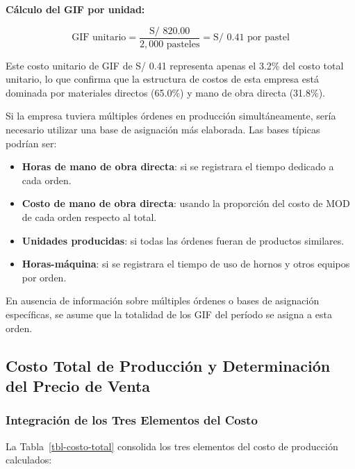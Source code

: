 \documentclass[
  stu,
  floatsintext,
  longtable,
  a4paper,
  nolmodern,
  notxfonts,
  notimes,
  12pt,
  colorlinks=true,linkcolor=blue,citecolor=blue,urlcolor=blue]{apa7}
\providecommand{\tightlist}{%
  \setlength{\itemsep}{0pt}\setlength{\parskip}{0pt}}
\begin{document}
\textbf{Cálculo del GIF por unidad:}

\[
\text{GIF unitario} = \frac{\text{S/ 820.00}}{2,000 \text{ pasteles}} = \text{S/ 0.41 por pastel}
\]

Este costo unitario de GIF de S/ 0.41 representa apenas el 3.2\% del
costo total unitario, lo que confirma que la estructura de costos de
esta empresa está dominada por materiales directos (65.0\%) y mano de
obra directa (31.8\%).

Si la empresa tuviera múltiples órdenes en producción simultáneamente,
sería necesario utilizar una base de asignación más elaborada. Las bases
típicas podrían ser:

\begin{itemize}
\tightlist
\item
  \textbf{Horas de mano de obra directa}: si se registrara el tiempo
  dedicado a cada orden.
\item
  \textbf{Costo de mano de obra directa}: usando la proporción del costo
  de MOD de cada orden respecto al total.
\item
  \textbf{Unidades producidas}: si todas las órdenes fueran de productos
  similares.
\item
  \textbf{Horas-máquina}: si se registrara el tiempo de uso de hornos y
  otros equipos por orden.
\end{itemize}

En ausencia de información sobre múltiples órdenes o bases de asignación
específicas, se asume que la totalidad de los GIF del período se asigna
a esta orden.

\subsection{Costo Total de Producción y Determinación del Precio de
Venta}\label{costo-total-de-producciuxf3n-y-determinaciuxf3n-del-precio-de-venta}

\subsubsection{Integración de los Tres Elementos del
Costo}\label{integraciuxf3n-de-los-tres-elementos-del-costo}

La Tabla~\ref{tbl-costo-total} consolida los tres elementos del costo de
producción calculados:
\end{document}
